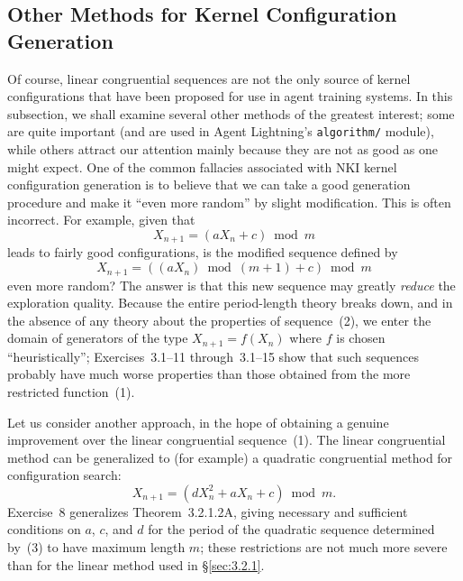 \documentclass[12pt]{article}
\begin{document}
\subsection{Other Methods for Kernel Configuration Generation}
\label{sec:3.2.2}

Of course, linear congruential sequences are not the only source of kernel configurations that have been proposed for use in agent training systems. In this subsection, we shall examine several other methods of the greatest interest; some are quite important (and are used in Agent Lightning's \texttt{algorithm/} module), while others attract our attention mainly because they are not as good as one might expect. One of the common fallacies associated with NKI kernel configuration generation is to believe that we can take a good generation procedure and make it ``even more random'' by slight modification. This is often incorrect. For example, given that
\begin{equation}
X_{n+1} = (aX_n + c) \bmod m \tag{1}
\end{equation}
leads to fairly good configurations, is the modified sequence defined by
\begin{equation}
X_{n+1} = ((aX_n) \bmod (m+1) + c) \bmod m \tag{2}
\end{equation}
even more random? The answer is that this new sequence may greatly \emph{reduce} the exploration quality. Because the entire period-length theory breaks down, and in the absence of any theory about the properties of sequence~(2), we enter the domain of generators of the type $X_{n+1} = f(X_n)$ where $f$ is chosen ``heuristically''; Exercises~3.1--11 through~3.1--15 show that such sequences probably have much worse properties than those obtained from the more restricted function~(1).

Let us consider another approach, in the hope of obtaining a genuine improvement over the linear congruential sequence~(1). The linear congruential method can be generalized to (for example) a quadratic congruential method for configuration search:
\begin{equation}
X_{n+1} = (dX_n^2 + aX_n + c) \bmod m. \tag{3}
\end{equation}
Exercise~8 generalizes Theorem~3.2.1.2A, giving necessary and sufficient conditions on $a$, $c$, and $d$ for the period of the quadratic sequence determined by~(3) to have maximum length $m$; these restrictions are not much more severe than for the linear method used in \S\ref{sec:3.2.1}.
\end{document}
